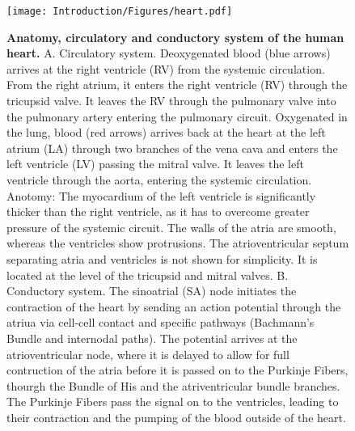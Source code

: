 \begin{figure}[hbtp]
	\centering
	\texttt{[image: Introduction/Figures/heart.pdf]}
	\caption[\textbf{Anatomy, circulatory and conductory system of the human heart. }]{\textbf{Anatomy, circulatory and conductory system of the human heart. }A. Circulatory system. Deoxygenated blood (blue arrows) arrives at the right ventricle (RV) from the systemic circulation. From the right atrium, it enters the right ventricle (RV) through the tricupsid valve. It leaves the RV through the pulmonary valve into the pulmonary artery entering the pulmonary circuit. Oxygenated in the lung, blood (red arrows) arrives back at the heart at the left atrium (LA) through two branches of the vena cava and enters the left ventricle (LV) passing the mitral valve. It leaves the left ventricle through the aorta, entering the systemic circulation. Anotomy: The myocardium of the left ventricle is significantly thicker than the right ventricle, as it has to overcome greater pressure of the systemic circuit. The walls of the atria are smooth, whereas the ventricles show protrusions. The atrioventricular septum separating atria and ventricles is not shown for simplicity. It is located at the level of the tricupsid and mitral valves. B. Conductory system. The sinoatrial (SA) node initiates the contraction of the heart by sending an action potential through the atriua via cell-cell contact and specific pathways (Bachmann's Bundle and internodal paths). The potential arrives at the atrioventricular node, where it is delayed to allow for full contruction of the atria before it is passed on to the Purkinje Fibers, thourgh the Bundle of His and the  atriventricular bundle branches. The Purkinje Fibers pass the signal on to the ventricles, leading to their contraction and the pumping of the blood outside of the heart. } 
	 	\label{fig:heart}
\end{figure}


